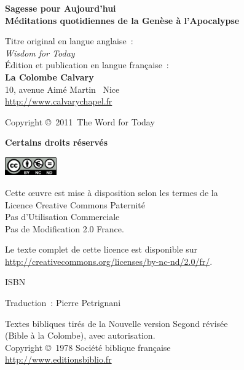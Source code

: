 \newpage
\mbox{}
\vfill

{\scriptsize

{\bfseries Sagesse pour Aujourd'hui\\
 Méditations quotidiennes de la Genèse à l'Apocalypse}

Titre original en langue anglaise~:\\
\emph{Wisdom for Today} \\

Édition et publication en langue française~:\\
 {\bfseries La Colombe Calvary}\\
 10, avenue Aimé Martin ~Nice\\
 \url{http://www.calvarychapel.fr}

Copyright \copyright{}~2011~The Word for Today

{\bfseries Certains droits réservés}

\includegraphics[width=6em]{by-nc-nd_eu}

Cette \oe{}uvre est mise à disposition selon les termes de la \\
 Licence Creative Commons Paternité \\
 \ocadr Pas d'Utilisation Commerciale \\
 \ocadr Pas de Modification 2.0 France.

Le texte complet de cette licence est disponible sur \\
 \url{http://creativecommons.org/licenses/by-nc-nd/2.0/fr/}.

ISBN~\isbn

Traduction~: Pierre Petrignani

Textes bibliques tirés de la Nouvelle version Segond révisée \\
 (Bible à la Colombe), avec autorisation. \\
 Copyright \copyright{}~1978 Société biblique française \\
 \url{http://www.editionsbiblio.fr}

}


